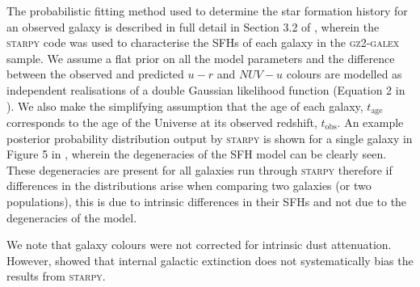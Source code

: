 \documentclass[useAMS,usenatbib]{mn2e}
\begin{document}

The probabilistic fitting method used to determine the star formation history for an observed galaxy is described in full detail in Section 3.2 of \cite{smethurst15}, wherein the \textsc{starpy} code was used to characterise the SFHs of each galaxy in the \textsc{gz2-galex} sample. We assume a flat prior on all the model parameters and the difference between the observed and predicted $u-r$ and $NUV-u$ colours are modelled as independent realisations of a double Gaussian likelihood function (Equation 2 in \citealt{smethurst15}). We also make the simplifying assumption that the age of each galaxy, $t_\mathrm{age}$ corresponds to the age of the Universe at its observed redshift, $t_\mathrm{obs}$. An example posterior probability distribution output by \textsc{starpy} is shown for a single galaxy in Figure 5 in \cite{smethurst15}, wherein the degeneracies of the SFH model can be clearly seen. These degeneracies are present for all galaxies run through \textsc{starpy} therefore if differences in the distributions arise when comparing two galaxies (or two populations), this is due to intrinsic differences in their SFHs and not due to the degeneracies of the model. 

We note that galaxy colours were not corrected for intrinsic dust attenuation. However,  \citet[][see Section~2.2]{smethurst16} showed that internal galactic extinction does not systematically bias the results from \textsc{starpy}. 
\end{document}
